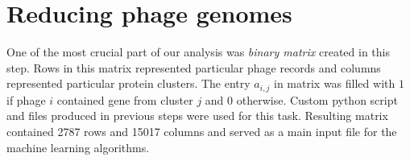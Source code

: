 \section{Reducing phage genomes}
One of the most crucial part of our analysis was \emph{binary matrix} created in this step.
Rows in this matrix represented particular phage records and columns represented particular protein clusters.
The entry $a_{i,j}$ in matrix was filled with $1$ if phage $i$ contained gene from cluster $j$ and $0$ otherwise.
Custom python script and files produced in previous steps were used for this task.
Resulting matrix contained 2787 rows and 15017 columns and served as a main input file for the machine learning algorithms.
